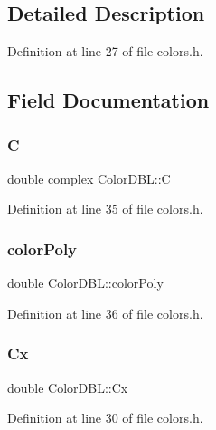 \subsection{Detailed Description}


Definition at line 27 of file colors.\+h.



\subsection{Field Documentation}
\mbox{\label{struct_color_d_b_l_a262fa54396ee6189934c95444b663e08}} 
\subsubsection{\texorpdfstring{C}{C}}
{\footnotesize\ttfamily double complex Color\+D\+B\+L\+::C}



Definition at line 35 of file colors.\+h.

\mbox{\label{struct_color_d_b_l_a0036bac7853b4736d63df2c9ddd5415f}} 
\subsubsection{\texorpdfstring{color\+Poly}{colorPoly}}
{\footnotesize\ttfamily double Color\+D\+B\+L\+::color\+Poly}



Definition at line 36 of file colors.\+h.

\mbox{\label{struct_color_d_b_l_a2a18d1e704fd3e7edd36e58aa1ad608e}} 
\subsubsection{\texorpdfstring{Cx}{Cx}}
{\footnotesize\ttfamily double Color\+D\+B\+L\+::\+Cx}



Definition at line 30 of file colors.\+h.

\mbox{\label{struct_color_d_b_l_a846fc0a4774b9a47d7dcc197aac61775}} 
